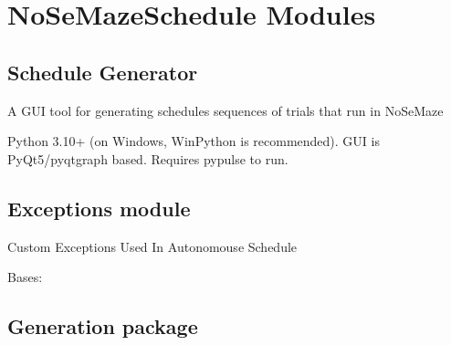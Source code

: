 \documentclass[letterpaper,10pt,english]{sphinxmanual}
\begin{document}
\section{NoSeMazeSchedule Modules}
\label{\detokenize{NoSeMazeSchedule/modules:nosemazeschedule-modules}}\label{\detokenize{NoSeMazeSchedule/modules::doc}}

\subsection{Schedule Generator}
\label{\detokenize{NoSeMazeSchedule/modules:schedule-generator}}
\sphinxAtStartPar
A GUI tool for generating schedules \sphinxhyphen{} sequences of trials that run in NoSeMaze

\sphinxAtStartPar
Python 3.10+ (on Windows, WinPython is recommended). GUI is PyQt5/pyqtgraph based. Requires pypulse to run.

\sphinxstepscope


\subsection{Exceptions module}
\label{\detokenize{NoSeMazeSchedule/Exceptions:module-Exceptions}}\label{\detokenize{NoSeMazeSchedule/Exceptions:exceptions-module}}\label{\detokenize{NoSeMazeSchedule/Exceptions::doc}}
\sphinxAtStartPar
Custom Exceptions Used In Autonomouse Schedule

\begin{fulllineitems}
\label{\detokenize{NoSeMazeSchedule/Exceptions:Exceptions.RewardMapError}}
\pysigstartsignatures
{}
\pysigstopsignatures
\sphinxAtStartPar
Bases: 

\end{fulllineitems}


\sphinxstepscope


\subsection{Generation package}
\label{\detokenize{NoSeMazeSchedule/Generation:generation-package}}\label{\detokenize{NoSeMazeSchedule/Generation::doc}}
\end{document}
